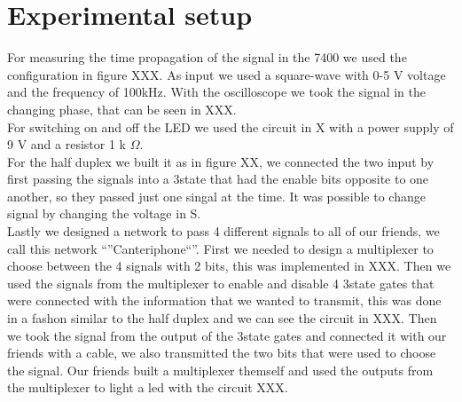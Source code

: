 \section{Experimental setup}
For measuring the time propagation of the signal in the 7400 we used the configuration in figure XXX. As input we used a square-wave with 0-5 V voltage and the frequency of 100kHz. With the oscilloscope we took the signal in the changing phase, that can be seen in XXX.\\
For switching on and off the LED we used the circuit in X with a power supply of 9 V and a resistor 1  k $\Omega$.\\
For the half duplex we built it as in figure XX, we connected the two input by first passing the signals into a  3state that had the enable bits opposite to one another, so they passed just one singal at the time. It was possible to change signal by changing the voltage in S.\\
Lastly we designed a network to pass 4 different signals to all of our friends, we call this network ``''Canteriphone``''. First we needed to design a multiplexer to choose between the 4 signals with 2 bits, this was implemented in XXX. Then we used the signals from the multiplexer to enable and disable 4 3state gates that were connected with the information that we wanted to transmit, this was done in a fashon similar to the half duplex and we can see the circuit in XXX. Then we took the signal from the output of the 3state gates and connected it with our friends with a cable, we also transmitted the two bits that were used to choose  the signal. Our friends built a multiplexer themself and used the outputs from the multiplexer to light a led with the circuit XXX.
